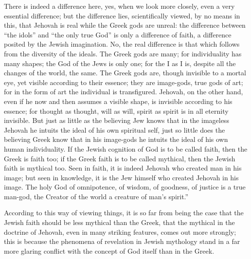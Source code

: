 \documentclass[12pt]{book}
\newcommand{\opage}[1]{\marginnote{\footnotesize\textit{[#1]}}}
\begin{document}
There is indeed a difference here, yes, when we look more closely, even
a very essential difference; but the difference lies, scientifically
viewed, by no means in this, that Jehovah is real while the Greek gods
are unreal: the difference between ``the idols'' and ``the only true
God'' is only a difference of faith, a difference posited by the Jewish
imagination. No, the real difference is that which follows from the
diversity of the ideals. The Greek gods are many; for individuality has
many shapes; the God of the Jews is only one; for the I as I is, despite
all the changes of the world, the same. The Greek gods are, though
invisible to a mortal eye, yet visible according to their essence; they
are image-gods, true gods of art;
\opage{97}\setcounter{footnote}{0}%
for in the form of art the individual is transfigured. Jehovah, on the
other hand, even if he now and then assumes a visible shape, is
invisible according to his essence; for thought as thought, will as
will, spirit as spirit is in all eternity invisible. But just as little
as the believing Jew knows that in the imageless Jehovah he intuits the
ideal of his own spiritual self, just so little does the believing Greek
know that in his image-gods he intuits the ideal of his own human
individuality. If the Jewish cognition of God is to be called faith,
then the Greek is faith too; if the Greek faith is to be called mythical,
then the Jewish faith is mythical too. Seen in faith, it is indeed
Jehovah who created man in his image; but seen in knowledge, it is the
Jew himself who created Jehovah in his image. The holy God of
omnipotence, of wisdom, of goodness, of justice is a true man-god, the
Creator of the world a creature of man's spirit.'' %

According to this way of viewing things, it is so far from being the
case that the Jewish faith should be less mythical than the Greek, that
the mythical in the doctrine of Jehovah, even in many striking features,
comes out more strongly; this is because the phenomena of revelation in
Jewish mythology stand in a far more glaring conflict with the concept
of God itself than in the Greek.
\end{document}

